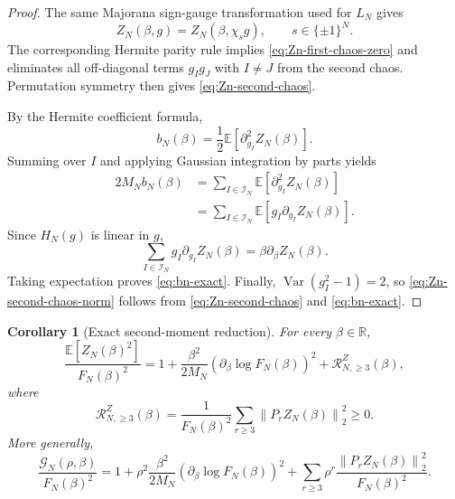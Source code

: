 \documentclass[11pt]{article}
\newtheorem{corollary}[theorem]{Corollary}
\newcommand{\E}{\mathbb{E}}
\newcommand{\Var}{\operatorname{Var}}
\newcommand{\R}{\mathbb{R}}
\newcommand{\calI}{\mathcal{I}}
\newcommand{\norm}[1]{\left\lVert #1\right\rVert}
\begin{document}
\begin{proof}
  The same Majorana sign-gauge transformation used for $L_N$ gives
  \begin{equation}\label{eq:Zn-gauge-invariance}
    Z_N(\beta,g)=Z_N(\beta,\chi_sg),
    \qquad s\in\{\pm1\}^N.
  \end{equation}
  The corresponding Hermite parity rule implies
  \eqref{eq:Zn-first-chaos-zero} and eliminates all off-diagonal terms
  $g_Ig_J$ with $I\neq J$ from the second chaos.  Permutation symmetry then
  gives \eqref{eq:Zn-second-chaos}.

  By the Hermite coefficient formula,
  \begin{equation}\label{eq:bn-second-derivative}
    b_N(\beta)
    =
    \frac12\E[\partial_{g_I}^2Z_N(\beta)].
  \end{equation}
  Summing over $I$ and applying Gaussian integration by parts yields
  \begin{equation}\label{eq:bn-gibp}
    \begin{aligned}
      2M_Nb_N(\beta)
      &=
      \sum_{I\in\calI_N}\E[\partial_{g_I}^2Z_N(\beta)]
      \\
      &=
      \sum_{I\in\calI_N}\E[g_I\partial_{g_I}Z_N(\beta)].
    \end{aligned}
  \end{equation}
  Since $H_N(g)$ is linear in $g$,
  \begin{equation}\label{eq:Zn-radial-derivative}
    \sum_{I\in\calI_N}g_I\partial_{g_I}Z_N(\beta)
    =
    \beta\partial_\beta Z_N(\beta).
  \end{equation}
  Taking expectation proves \eqref{eq:bn-exact}.  Finally,
  $\Var(g_I^2-1)=2$, so \eqref{eq:Zn-second-chaos-norm} follows from
  \eqref{eq:Zn-second-chaos} and \eqref{eq:bn-exact}.
\end{proof}

\begin{corollary}[Exact second-moment reduction]
  \label{cor:Zn-exact-second-moment-reduction}
  For every $\beta\in\R$,
  \begin{equation}\label{eq:Zn-exact-second-moment-reduction}
    \frac{\E[Z_N(\beta)^2]}{F_N(\beta)^2}
    =
    1
    +
    \frac{\beta^2}{2M_N}
    \left(
      \partial_\beta\log F_N(\beta)
    \right)^2
    +
    \mathcal R_{N,\geq3}^{Z}(\beta),
  \end{equation}
  where
  \begin{equation}\label{eq:Zn-higher-chaos-remainder}
    \mathcal R_{N,\geq3}^{Z}(\beta)
    =
    \frac1{F_N(\beta)^2}
    \sum_{r\geq3}\norm{P_rZ_N(\beta)}_2^2
    \geq0.
  \end{equation}
  More generally,
  \begin{equation}\label{eq:Zn-rho-exact-reduction}
    \frac{\mathcal G_N(\rho,\beta)}{F_N(\beta)^2}
    =
    1
    +
    \rho^2\frac{\beta^2}{2M_N}
    \left(
      \partial_\beta\log F_N(\beta)
    \right)^2
    +
    \sum_{r\geq3}\rho^r
    \frac{\norm{P_rZ_N(\beta)}_2^2}{F_N(\beta)^2}.
  \end{equation}
\end{corollary}
\end{document}
